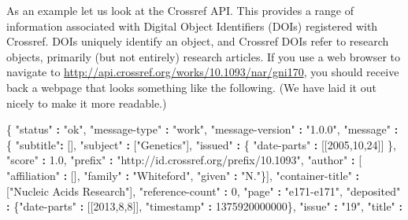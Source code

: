 \documentclass[]{krantz}
\newenvironment{Shaded}{\begin{snugshade}}{\end{snugshade}}
\newcommand{\DecValTok}[1]{\textcolor[rgb]{0.00,0.00,0.81}{#1}}
\newcommand{\FloatTok}[1]{\textcolor[rgb]{0.00,0.00,0.81}{#1}}
\newcommand{\StringTok}[1]{\textcolor[rgb]{0.31,0.60,0.02}{#1}}
\newcommand{\OperatorTok}[1]{\textcolor[rgb]{0.81,0.36,0.00}{\textbf{#1}}}
\newcommand{\NormalTok}[1]{#1}
\begin{document}
As an example let us look at the Crossref API. This provides a range of
information associated with Digital Object Identifiers (DOIs) registered
with Crossref. DOIs uniquely identify an object, and Crossref DOIs refer
to research objects, primarily (but not entirely) research articles. If
you use a web browser to navigate to
\url{http://api.crossref.org/works/10.1093/nar/gni170}, you should
receive back a webpage that looks something like the following. (We have
laid it out nicely to make it more readable.)

\begin{Shaded}
\begin{Highlighting}[]
\NormalTok{\{ }\StringTok{"status"} \OperatorTok{:}\StringTok{ "ok"}\NormalTok{,}
  \StringTok{"message-type"} \OperatorTok{:}\StringTok{ "work"}\NormalTok{,}
  \StringTok{"message-version"} \OperatorTok{:}\StringTok{ "1.0.0"}\NormalTok{,}
  \StringTok{"message"} \OperatorTok{:}
\StringTok{   }\NormalTok{\{ }\StringTok{"subtitle"}\OperatorTok{:}\StringTok{ }\NormalTok{[],}
     \StringTok{"subject"} \OperatorTok{:}\StringTok{ }\NormalTok{[}\StringTok{"Genetics"}\NormalTok{],}
     \StringTok{"issued"} \OperatorTok{:}\StringTok{ }\NormalTok{\{ }\StringTok{"date-parts"} \OperatorTok{:}\StringTok{ }\NormalTok{[[}\DecValTok{2005}\NormalTok{,}\DecValTok{10}\NormalTok{,}\DecValTok{24}\NormalTok{]] \},}
     \StringTok{"score"} \OperatorTok{:}\StringTok{ }\FloatTok{1.0}\NormalTok{,}
     \StringTok{"prefix"} \OperatorTok{:}\StringTok{ "http://id.crossref.org/prefix/10.1093"}\NormalTok{,}
     \StringTok{"author"} \OperatorTok{:}\StringTok{ }\NormalTok{[ }\StringTok{"affiliation"} \OperatorTok{:}\StringTok{ }\NormalTok{[],}
                   \StringTok{"family"} \OperatorTok{:}\StringTok{ "Whiteford"}\NormalTok{,}
                   \StringTok{"given"} \OperatorTok{:}\StringTok{ "N."}\NormalTok{\}],}
     \StringTok{"container-title"} \OperatorTok{:}\StringTok{ }\NormalTok{[}\StringTok{"Nucleic Acids Research"}\NormalTok{],}
     \StringTok{"reference-count"} \OperatorTok{:}\StringTok{ }\DecValTok{0}\NormalTok{,}
     \StringTok{"page"} \OperatorTok{:}\StringTok{ "e171-e171"}\NormalTok{,}
     \StringTok{"deposited"} \OperatorTok{:}\StringTok{ }\NormalTok{\{}\StringTok{"date-parts"} \OperatorTok{:}\StringTok{ }\NormalTok{[[}\DecValTok{2013}\NormalTok{,}\DecValTok{8}\NormalTok{,}\DecValTok{8}\NormalTok{]],}
                    \StringTok{"timestamp"} \OperatorTok{:}\StringTok{ }\DecValTok{1375920000000}\NormalTok{\},}
     \StringTok{"issue"} \OperatorTok{:}\StringTok{ "19"}\NormalTok{,}
     \StringTok{"title"} \OperatorTok{:}

\end{Highlighting}
\end{Shaded}
\end{document}
